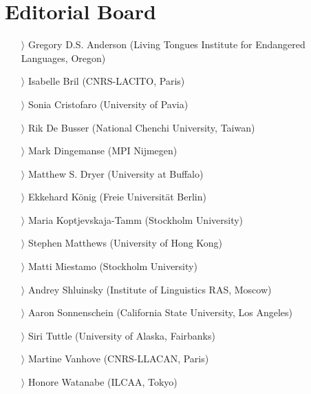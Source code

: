 \documentclass[
notumble,
nofoldmark,
]{leaflet}
\begin{document}
{    \section{Editorial Board}
    \begin{itemize}
    \item[$\rangle$] Gregory D.S. Anderson (Living Tongues Institute for Endangered Languages, Oregon)
    \item[$\rangle$] Isabelle Bril (CNRS-LACITO, Paris)
    \item[$\rangle$] Sonia Cristofaro (University of Pavia)
    \item[$\rangle$] Rik De Busser (National Chenchi University, Taiwan)
    \item[$\rangle$] Mark Dingemanse (MPI Nijmegen)
    \item[$\rangle$] Matthew S. Dryer (University at Buffalo)
    \item[$\rangle$] Ekkehard K\"onig (Freie Universit\"at Berlin)
    \item[$\rangle$] Maria Koptjevskaja-Tamm (Stockholm University)
    \item[$\rangle$] Stephen Matthews (University of Hong Kong)
    \item[$\rangle$] Matti Miestamo (Stockholm University)
    \item[$\rangle$] Andrey Shluinsky (Institute of Linguistics RAS, Moscow)
    \item[$\rangle$] Aaron Sonnenschein (California State University, Los Angeles)
    \item[$\rangle$] Siri Tuttle (University of Alaska, Fairbanks)
    \item[$\rangle$] Martine Vanhove (CNRS-LLACAN, Paris)
    \item[$\rangle$] Honore Watanabe (ILCAA, Tokyo)
    \end{itemize}    
}
\end{document}
